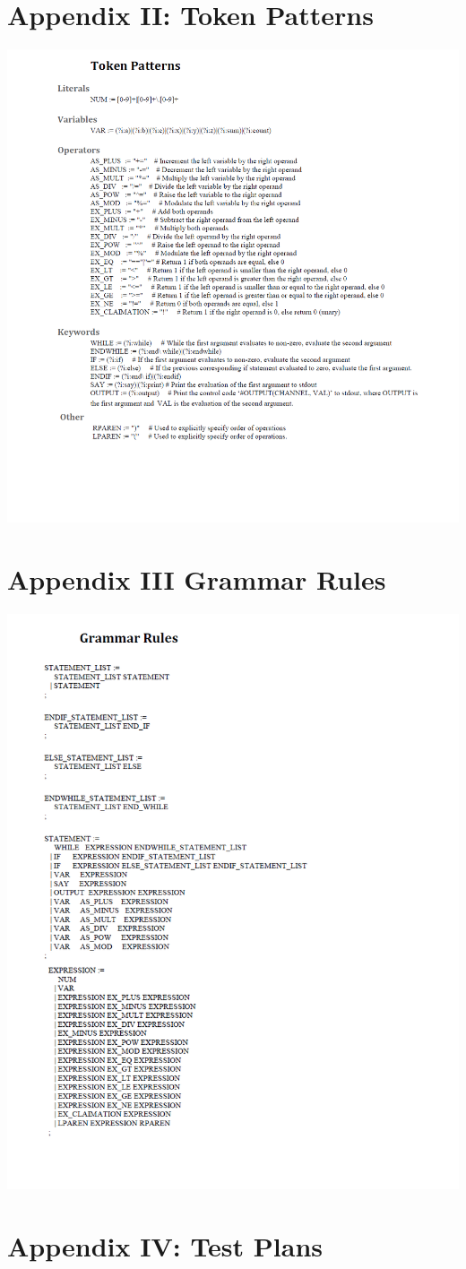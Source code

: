 \documentclass[12pt,a4paper]{article}
\begin{document}
  \section{Appendix II: Token Patterns}
  \includegraphics[width=7in]{apx2.png}
    \section{Appendix III Grammar Rules}
    \includegraphics[width=6in]{apx3.png}
\section{Appendix IV: Test Plans}

    

 
  
  
 
       
\end{document}
